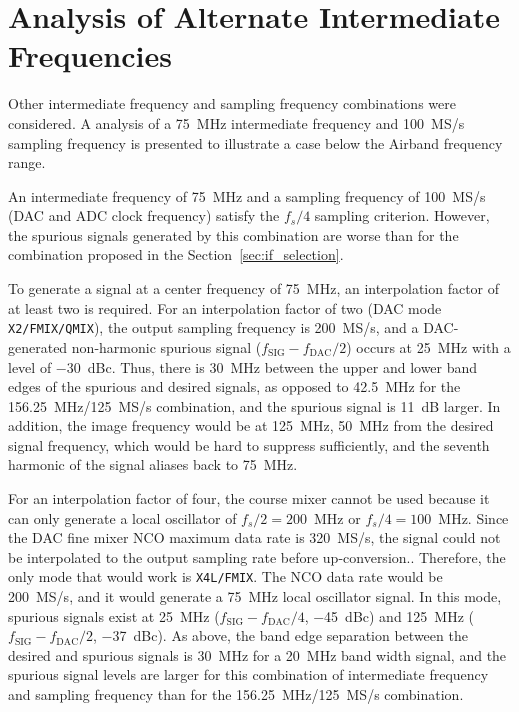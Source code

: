 \documentclass[12pt,letterpaper]{article}
\begin{document}
\appendix

\section{Analysis of Alternate Intermediate Frequencies}

Other intermediate frequency and sampling frequency combinations were
considered. A analysis of a 75~MHz intermediate frequency and 100~MS/s
sampling frequency is presented to illustrate a case below the Airband
frequency range.

An intermediate frequency of 75~MHz and a sampling frequency of
100~MS/s (DAC and ADC clock frequency) satisfy the $f_s/4$ sampling
criterion. However, the spurious signals generated by this combination
are worse than for the combination proposed in the
Section~\ref{sec:if_selection}.

To generate a signal at a center frequency of 75~MHz, an interpolation
factor of at least two is required. For an interpolation factor of two
(DAC mode \texttt{X2/FMIX/QMIX}), the output sampling frequency is
200~MS/s, and a DAC-generated non-harmonic spurious signal
($f_\text{SIG}-f_\text{DAC}/2$) occurs at 25~MHz with a level of
$-30$~dBc. Thus, there is 30~MHz between the upper and lower band
edges of the spurious and desired signals, as opposed to 42.5~MHz for
the 156.25~MHz/125~MS/s combination, and the spurious signal is 11~dB
larger. In addition, the image frequency would be at 125~MHz, 50~MHz
from the desired signal frequency, which would be hard to suppress
sufficiently, and the seventh harmonic of the signal aliases back to
75~MHz.

For an interpolation factor of four, the course mixer cannot be used
because it can only generate a local oscillator of $f_s/2=200$~MHz or
$f_s/4=100$~MHz. Since the DAC fine mixer NCO maximum data rate is
320~MS/s, the signal could not be interpolated to the output sampling
rate before up-conversion.. Therefore, the only mode that would work
is \texttt{X4L/FMIX}. The NCO data rate would be 200~MS/s, and it
would generate a 75~MHz local oscillator signal. In this mode,
spurious signals exist at 25~MHz ($f_\text{SIG}-f_\text{DAC}/4$,
$-$45~dBc) and 125~MHz ($f_\text{SIG}-f_\text{DAC}/2$, $-$37~dBc). As
above, the band edge separation between the desired and spurious
signals is 30~MHz for a 20~MHz band width signal, and the spurious
signal levels are larger for this combination of intermediate
frequency and sampling frequency than for the 156.25~MHz/125~MS/s
combination.
\end{document}
